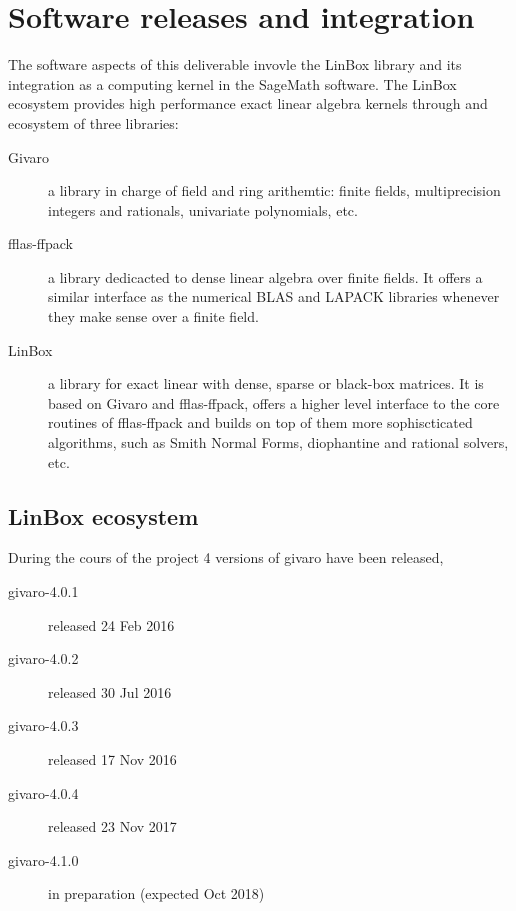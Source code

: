 \documentclass{deliverablereport}
\begin{document}
\section{Software releases and integration}

The software aspects of this deliverable invovle the LinBox library
and its integration as a computing kernel in the SageMath software.
The LinBox ecosystem provides high performance exact linear algebra kernels
through and ecosystem of three libraries:
\begin{description}
  \item[Givaro] a library in charge of field and ring arithemtic: finite
    fields, multiprecision integers and rationals, univariate polynomials, etc.
  \item[fflas-ffpack] a library dedicacted to dense linear algebra over finite
    fields. It offers a similar interface as the numerical BLAS and LAPACK
    libraries whenever they make sense over a finite field.
  \item[LinBox] a library for exact linear with dense, sparse or black-box
    matrices. It is based on Givaro and fflas-ffpack, offers a higher level interface
    to the core routines of fflas-ffpack and builds on top of them more
    sophiscticated algorithms, such as Smith Normal Forms, diophantine and
    rational solvers, etc.
  \end{description}

\subsection{LinBox ecosystem}

During the cours of the project 4 versions of givaro have been released, 
\begin{description}
  \item[givaro-4.0.1] released 24 Feb 2016
  \item[givaro-4.0.2] released 30 Jul 2016
  \item[givaro-4.0.3] released 17 Nov 2016
  \item[givaro-4.0.4] released 23 Nov 2017
  \item[givaro-4.1.0] in preparation (expected Oct 2018)
\end{description}
\end{document}
